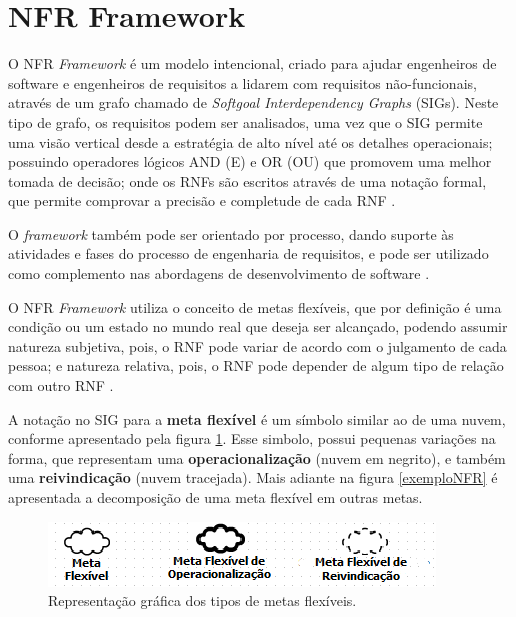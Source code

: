 \pagebreak

\section{NFR Framework}
\label{sec:NFR}

O NFR \textit{Framework}  é um modelo intencional, criado para ajudar engenheiros de software e engenheiros de requisitos a lidarem com requisitos não-funcionais, através de um grafo chamado de \textit{Softgoal Interdependency Graphs} (SIGs). Neste tipo de grafo, os requisitos podem ser analisados, uma vez que o SIG permite uma visão vertical desde a estratégia de alto nível até os detalhes operacionais;  possuindo operadores lógicos AND (E) e OR (OU) que promovem uma melhor tomada de decisão; onde  os RNFs são escritos através de uma notação formal, que permite comprovar a precisão e completude de cada RNF \cite{chung2012non}. 

O \textit{framework} também pode ser orientado por processo, dando suporte às atividades e fases do processo de engenharia de requisitos, e pode ser utilizado como complemento nas abordagens de desenvolvimento de software \cite{chung2012non}.

O NFR \textit{Framework} utiliza o conceito de metas flexíveis, que por definição é uma condição ou um estado no mundo real que deseja ser alcançado, podendo assumir natureza subjetiva, pois, o RNF pode variar de acordo com o julgamento de cada pessoa; e natureza relativa, pois, o RNF pode depender de algum tipo de relação com outro RNF \cite{chung2012non}.

\pagebreak

A notação no SIG para a \textbf{meta flexível} é um símbolo similar ao de uma nuvem, conforme apresentado pela figura \ref{fig01}. Esse simbolo, possui pequenas variações na forma, que representam uma \textbf{operacionalização} (nuvem em negrito), e também uma \textbf{reivindicação} (nuvem tracejada). Mais adiante na figura \ref{exemploNFR} é apresentada a decomposição de uma meta flexível em outras metas.  

\begin{figure}[h!]
	\centering
	\includegraphics[keepaspectratio=true,scale=0.9]{figuras/tiposDeSoftgoals.png}
	\caption{Representação gráfica dos tipos de metas flexíveis.}
	\label{fig01}
\end{figure} 


